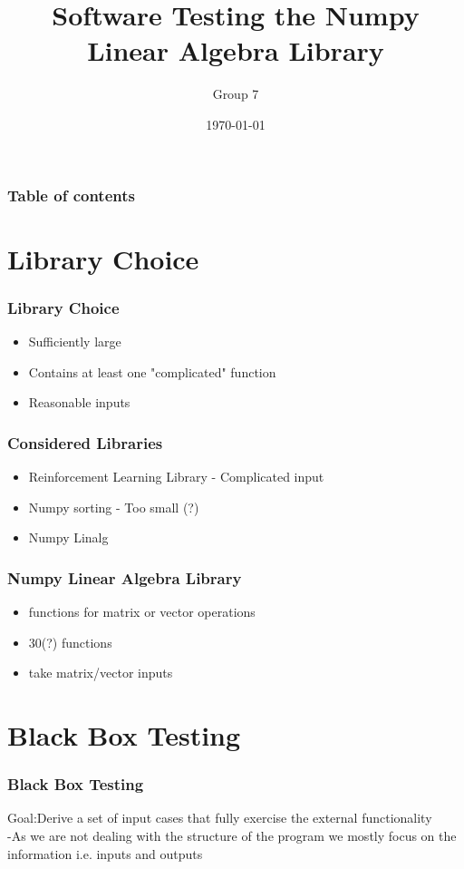 \documentclass{beamer}
\begin{document}
\title{Software Testing the Numpy Linear Algebra Library}  
\author{Group 7}

\date{\today} 
\begin{frame}
\titlepage
\end{frame}

\begin{frame}\frametitle{Table of contents}\tableofcontents
\end{frame} 

\section{Library Choice}
\begin{frame}
\frametitle{Library Choice} 
\begin{itemize}
\item Sufficiently large\\
\item Contains at least one "complicated" function\\
\item Reasonable inputs \\
\end{itemize}
\end{frame}

\begin{frame}\frametitle{Considered Libraries} 
\begin{itemize}
\item Reinforcement Learning Library - Complicated input 
\item Numpy sorting - Too small (?)
\item Numpy Linalg 
\end{itemize}
\end{frame}


\begin{frame}\frametitle{Numpy Linear Algebra Library} 
\begin{itemize}

\item functions for matrix or vector operations 
\item 30(?) functions
\item take matrix/vector inputs 
\end{itemize}
\end{frame}

\section{Black Box Testing}
\begin{frame}\frametitle{Black Box Testing} 
Goal:Derive a set of input cases that fully exercise the external functionality\\

-As we are not dealing with the structure of the program we mostly focus on the information i.e. inputs and outputs
\end{frame}
\end{document}
